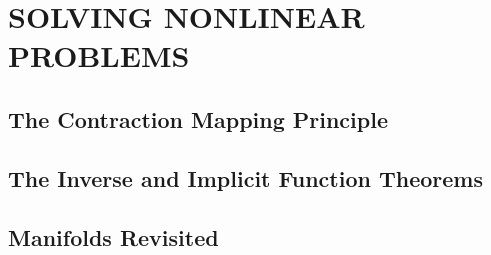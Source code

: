 \section{SOLVING NONLINEAR PROBLEMS}
\subsection{The Contraction Mapping Principle}
\subsection{The Inverse and Implicit Function Theorems}
\subsection{Manifolds Revisited}